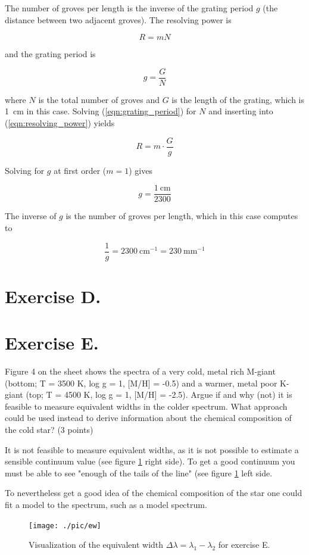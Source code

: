 \documentclass[11pt,a4paper,twoside]{article}
\begin{document}
The number of groves per length is the inverse of the grating period 
$g$ (the distance between two adjacent groves). The resolving power is 

\begin{equation}
 R = m N
 \label{eqn:resolving_power}
\end{equation}

and the grating period is 

\begin{equation}
 g = \frac{G}{N}
 \label{eqn:grating_period}
\end{equation}

where $N$ is the total number of groves and $G$ is the length of the grating, 
which is \SI{1}{\cm} in this case. Solving (\ref{eqn:grating_period}) 
for $N$ and inserting into (\ref{eqn:resolving_power}) yields 

\begin{equation}
 R = m \cdot \frac{G}{g}
\end{equation}

Solving for $g$ at first order ($m = 1$) gives 

\begin{equation}
 g = \frac{\SI{1}{\cm}}{2300}
\end{equation}

The inverse of $g$ is the number of groves per length, which in this case computes to 

\begin{equation}
 \frac{1}{g} = \SI{2300}{\cm^{-1}} = \SI{230}{\mm^{-1}}
\end{equation}

\section*{Exercise D.}
\section*{Exercise E.}

Figure 4 on the sheet shows the spectra of a very cold, metal rich M-giant 
(bottom; T = 3500 K, log g = 1, [M/H] = -0.5) and a warmer, metal poor K-giant 
(top; T = 4500 K, log g = 1, [M/H] = -2.5). Argue if and why (not) it is 
feasible to measure equivalent widths in the colder spectrum. What approach 
could be used instead to derive information about the chemical composition of 
the cold star? (3 points)
\newline

It is not feasible to measure equivalent widths, as it is not possible to 
estimate a sensible continuum value (see figure \ref{fig:ew} right side). To
get a good continuum you must be able to see "enough of the tails of the 
line" (see figure \ref{fig:ew} left side.

To nevertheless get a good idea of the chemical composition of the star one 
could fit a model to the spectrum, such as a model spectrum.

\begin{figure}
\centering
\texttt{[image: ./pic/ew]}
\caption{Visualization of the equivalent width $\Delta\lambda = 
\lambda_1 - \lambda_2$ for exercise E.}
\label{fig:ew}
\end{figure}
\end{document}
